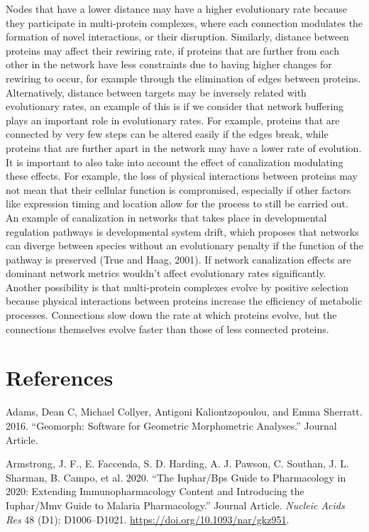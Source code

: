 \documentclass[]{elsarticle} %
\begin{document}
Nodes that have a lower distance may have a higher evolutionary rate because they participate in multi-protein complexes, where each connection modulates the formation of novel interactions, or their disruption. Similarly, distance between proteins may affect their rewiring rate, if proteins that are further from each other in the network have less constraints due to having higher changes for rewiring to occur, for example through the elimination of edges between proteins. Alternatively, distance between targets may be inversely related with evolutionary rates, an example of this is if we consider that network buffering plays an important role in evolutionary rates. For example, proteins that are connected by very few steps can be altered easily if the edges break, while proteins that are further apart in the network may have a lower rate of evolution. It is important to also take into account the effect of canalization modulating these effects. For example, the loss of physical interactions between proteins may not mean that their cellular function is compromised, especially if other factors like expression timing and location allow for the process to still be carried out. An example of canalization in networks that takes place in developmental regulation pathways is developmental system drift, which proposes that networks can diverge between species without an evolutionary penalty if the function of the pathway is preserved (True and Haag, 2001). If network canalization effects are dominant network metrics wouldn't affect evolutionary rates significantly. Another possibility is that multi-protein complexes evolve by positive selection because physical interactions between proteins increase the efficiency of metabolic processes. Connections slow down the rate at which proteins evolve, but the connections themselves evolve faster than those of less connected proteins.

\hypertarget{references}{%
\section*{References}\label{references}}

\hypertarget{refs}{}
\leavevmode\hypertarget{ref-Adams2016}{}%
Adams, Dean C, Michael Collyer, Antigoni Kaliontzopoulou, and Emma Sherratt. 2016. ``Geomorph: Software for Geometric Morphometric Analyses.'' Journal Article.

\leavevmode\hypertarget{ref-Armstrong2020}{}%
Armstrong, J. F., E. Faccenda, S. D. Harding, A. J. Pawson, C. Southan, J. L. Sharman, B. Campo, et al. 2020. ``The Iuphar/Bps Guide to Pharmacology in 2020: Extending Immunopharmacology Content and Introducing the Iuphar/Mmv Guide to Malaria Pharmacology.'' Journal Article. \emph{Nucleic Acids Res} 48 (D1): D1006--D1021. \url{https://doi.org/10.1093/nar/gkz951}.
\end{document}
